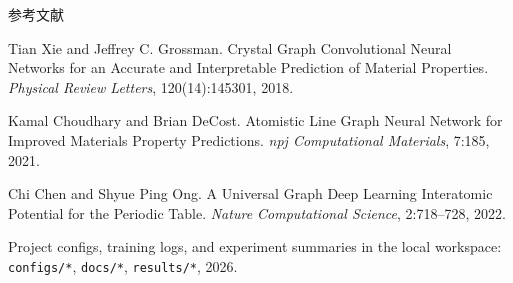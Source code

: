 \documentclass{beamer}
\begin{document}
\begin{frame}{参考文献}
\footnotesize
\color{black}
\raggedright
\noindent [1] Tian Xie and Jeffrey C. Grossman. Crystal Graph Convolutional Neural Networks for an Accurate and Interpretable Prediction of Material Properties. \emph{Physical Review Letters}, 120(14):145301, 2018.

\vspace{0.6em}
\noindent [2] Kamal Choudhary and Brian DeCost. Atomistic Line Graph Neural Network for Improved Materials Property Predictions. \emph{npj Computational Materials}, 7:185, 2021.

\vspace{0.6em}
\noindent [3] Chi Chen and Shyue Ping Ong. A Universal Graph Deep Learning Interatomic Potential for the Periodic Table. \emph{Nature Computational Science}, 2:718--728, 2022.

\vspace{0.6em}
\noindent [4] Project configs, training logs, and experiment summaries in the local workspace: \texttt{configs/*}, \texttt{docs/*}, \texttt{results/*}, 2026.
\end{frame}
\end{document}
